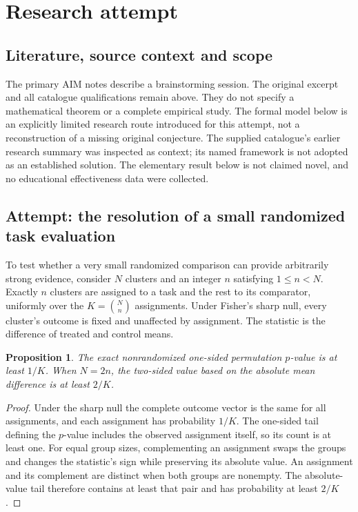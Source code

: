 \documentclass[11pt]{article}
\newtheorem{proposition}{Proposition}
\begin{document}
\section{Research attempt}
\subsection{Literature, source context and scope}
The primary AIM notes describe a brainstorming session. The original excerpt and all catalogue qualifications remain above. They do not specify a mathematical theorem or a complete empirical study. The formal model below is an explicitly limited research route introduced for this attempt, not a reconstruction of a missing original conjecture. The supplied catalogue's earlier research summary was inspected as context; its named framework is not adopted as an established solution. The elementary result below is not claimed novel, and no educational effectiveness data were collected.

\subsection{Attempt: the resolution of a small randomized task evaluation}
To test whether a very small randomized comparison can provide arbitrarily strong evidence, consider $N$ clusters and an integer $n$ satisfying $1\le n<N$. Exactly $n$ clusters are assigned to a task and the rest to its comparator, uniformly over the $K=\binom Nn$ assignments. Under Fisher's sharp null, every cluster's outcome is fixed and unaffected by assignment. The statistic is the difference of treated and control means.
\begin{proposition}
The exact nonrandomized one-sided permutation $p$-value is at least $1/K$. When $N=2n$, the two-sided value based on the absolute mean difference is at least $2/K$.
\end{proposition}
\begin{proof}
Under the sharp null the complete outcome vector is the same for all assignments, and each assignment has probability $1/K$. The one-sided tail defining the $p$-value includes the observed assignment itself, so its count is at least one. For equal group sizes, complementing an assignment swaps the groups and changes the statistic's sign while preserving its absolute value. An assignment and its complement are distinct when both groups are nonempty. The absolute-value tail therefore contains at least that pair and has probability at least $2/K$.
\end{proof}
\end{document}
